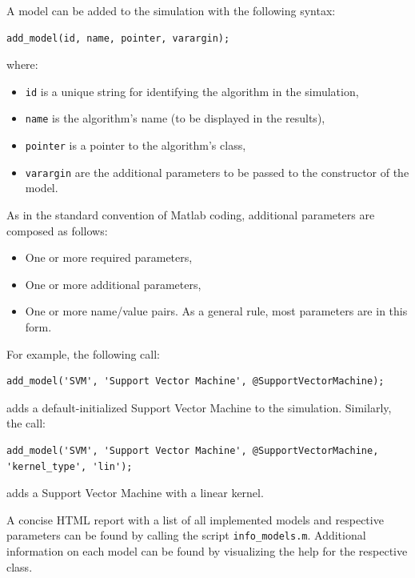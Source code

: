 A model can be added to the simulation with the following syntax:

\begin{lstlisting}
add_model(id, name, pointer, varargin);
\end{lstlisting}

\noindent where:

\begin{itemize}
	\item \verb|id| is a unique string for identifying the algorithm in the simulation,
	\item \verb|name| is the algorithm's name (to be displayed in the results),
	\item \verb|pointer| is a pointer to the algorithm's class,
	\item \verb|varargin| are the additional parameters to be passed to the constructor of the model.
\end{itemize}

\noindent As in the standard convention of Matlab coding, additional parameters are composed as follows:

\begin{itemize}
	\item One or more required parameters,
	\item One or more additional parameters,
	\item One or more name/value pairs. As a general rule, most parameters are in this form.
\end{itemize}

\noindent For example, the following call:

\begin{lstlisting}
add_model('SVM', 'Support Vector Machine', @SupportVectorMachine);
\end{lstlisting}

\noindent adds a default-initialized Support Vector Machine to the simulation. Similarly, the call:

\begin{lstlisting}
add_model('SVM', 'Support Vector Machine', @SupportVectorMachine, 'kernel_type', 'lin');
\end{lstlisting}

\noindent adds a Support Vector Machine with a linear kernel.

A concise HTML report with a list of all implemented models and respective parameters can be found by calling the script \verb|info_models.m|. Additional information on each model can be found by visualizing the help for the respective class.

